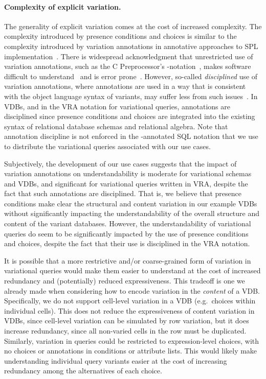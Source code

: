 \paragraph{Complexity of explicit variation.}
%
The generality of explicit variation comes at the cost of increased complexity.
The complexity introduced by presence conditions and choices is similar to the
complexity introduced by variation annotations in annotative approaches to SPL
implementation~\cite{KAK08}. There is widespread acknowledgment that
unrestricted use of variation annotations, such as the C Preprocessor's -notation~\cite{cpp}, makes software difficult to understand~\cite{LWE11vl} and
is error prone~\cite{FMKPA:SPLC16}.
%
However, so-called \emph{disciplined} use of variation annotations, where
annotations are used in a way that is consistent with the object language
syntax of variants, may suffer less from such issues~\cite{LKA:AOSD11}. In
VDBs, and in the VRA notation for variational queries, annotations are disciplined since
presence conditions and choices are integrated into the existing syntax of
relational database schemas and relational algebra.
%
Note that annotation discipline is not enforced in the -annotated SQL
notation that we use to distribute the variational queries associated with our use cases.


Subjectively, the development of our use cases suggests that the impact
of variation annotations on understandability is moderate for variational schemas and
VDBs, and significant for variational queries written in VRA, despite the fact that such
annotations are disciplined.
%
%
 That is, we believe that presence conditions make clear the structural and
 content variation in our example VDBs without significantly impacting the
 understandability of the overall structure and content of the variant
 databases. However, the understandability of variational queries do seem to be
 significantly impacted by the use of presence conditions and choices, despite
 the fact that their use is disciplined in the VRA notation.


It is possible that a more restrictive and/or coarse-grained form of variation
in variational queries would make them easier to understand at the cost of increased
redundancy and (potentially) reduced expressiveness.
%
This tradeoff is one we already made when considering how to encode variation
in the \emph{content} of a VDB. Specifically, we do not support cell-level
variation in a VDB (e.g.\ choices within individual cells). This does not
reduce the expressiveness of content variation in VDBs, since cell-level
variation can be simulated by row variation, but it does increase redundancy,
since all non-varied cells in the row must be duplicated.
%
Similarly, variation in queries could be restricted to expression-level
choices, with no choices or annotations in conditions or attribute lists. This
would likely make understanding individual query variants easier at the cost of
increasing redundancy among the alternatives of each choice.


